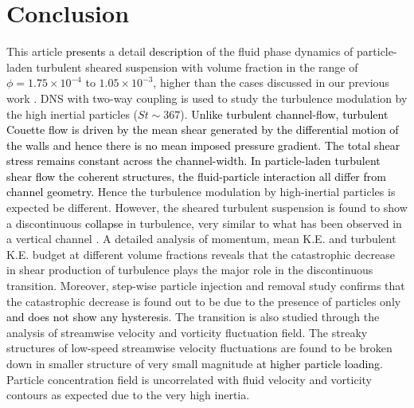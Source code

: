 \documentclass[aip,graphicx]{revtex4-1}
\begin{document}
\section{Conclusion}
This article \textcolor{black}{presents} a detail \textcolor{black}{description} of the fluid phase dynamics of particle-laden turbulent sheared suspension with volume fraction in the range of $\phi=1.75\times10^{-4}$ to $1.05\times10^{-3}$, higher than the cases discussed in our previous work \citep{ghosh2022statistical}. DNS with two-way coupling is used to study the turbulence modulation by the high inertial particles ($St\sim367$). 
\textcolor{black}{Unlike turbulent channel-flow, turbulent Couette flow is driven by the mean shear generated by the differential motion of the walls and hence there is no mean imposed pressure gradient. The total shear stress remains constant across the channel-width. In particle-laden turbulent shear flow the coherent structures, the fluid-particle interaction all differ from channel geometry.}    
Hence the turbulence modulation by high-inertial particles is expected be different. However, the sheared turbulent suspension is found to show a discontinuous \textcolor{black}{collapse} in turbulence, very similar to what has been observed in a vertical channel \citep{muramulla2020disruption}. A detailed analysis of momentum, mean K.E. and turbulent K.E. budget at different volume fractions reveals that the catastrophic decrease in shear production of turbulence plays the major role in the discontinuous transition. Moreover, step-wise particle injection and removal study confirms that the catastrophic decrease is found out to be due to the presence of particles only \textcolor{black}{and does not show any hysteresis}. The transition is also studied through the analysis of streamwise velocity and vorticity fluctuation field. The streaky structures of low-speed streamwise velocity fluctuations are found to be broken down in smaller structure of very small magnitude \textcolor{black}{at higher particle loading}. Particle concentration field is uncorrelated with fluid velocity and vorticity contours as expected due to the very high inertia. 
\end{document}
